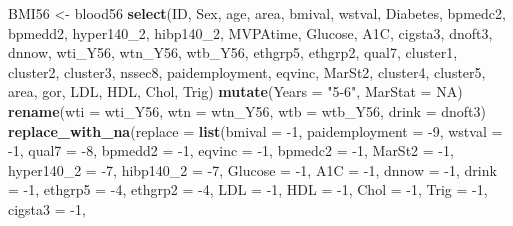 \documentclass[]{article}
\newenvironment{Shaded}{\begin{snugshade}}{\end{snugshade}}
\newcommand{\KeywordTok}[1]{\textcolor[rgb]{0.12,0.11,0.11}{\textbf{#1}}}
\newcommand{\DataTypeTok}[1]{\textcolor[rgb]{0.00,0.34,0.68}{#1}}
\newcommand{\DecValTok}[1]{\textcolor[rgb]{0.69,0.50,0.00}{#1}}
\newcommand{\StringTok}[1]{\textcolor[rgb]{0.75,0.01,0.01}{#1}}
\newcommand{\OtherTok}[1]{\textcolor[rgb]{0.00,0.43,0.16}{#1}}
\newcommand{\OperatorTok}[1]{\textcolor[rgb]{0.12,0.11,0.11}{#1}}
\newcommand{\NormalTok}[1]{\textcolor[rgb]{0.12,0.11,0.11}{#1}}
\begin{document}
\begin{Shaded}
\begin{Highlighting}[]
{{{{{{{{{{{{{{{{{{{{{{{{{{{{{{{{{{{{{{{{{{{\NormalTok{BMI56 <-}\StringTok{ }\NormalTok{blood56 }\OperatorTok{%>%}\StringTok{ }
\StringTok{  }\KeywordTok{select}\NormalTok{(ID, Sex, age, area, bmival, wstval, Diabetes, bpmedc2, bpmedd2, }
\NormalTok{         hyper140_}\DecValTok{2}\NormalTok{, hibp140_}\DecValTok{2}\NormalTok{, MVPAtime, Glucose, A1C, cigsta3, dnoft3, }
\NormalTok{         dnnow, wti_Y56, wtn_Y56, wtb_Y56, ethgrp5, ethgrp2, qual7,}
\NormalTok{         cluster1, cluster2, cluster3, nssec8, paidemployment, eqvinc, }
\NormalTok{         MarSt2, cluster4, cluster5, area, gor, LDL, HDL, Chol, Trig) }\OperatorTok{%>%}\StringTok{ }
\StringTok{  }\KeywordTok{mutate}\NormalTok{(}\DataTypeTok{Years =} \StringTok{"5-6"}\NormalTok{, }\DataTypeTok{MarStat =} \OtherTok{NA}\NormalTok{) }\OperatorTok{%>%}\StringTok{ }
\StringTok{  }\KeywordTok{rename}\NormalTok{(}\DataTypeTok{wti =}\NormalTok{ wti_Y56, }\DataTypeTok{wtn =}\NormalTok{ wtn_Y56, }\DataTypeTok{wtb =}\NormalTok{ wtb_Y56, }\DataTypeTok{drink =}\NormalTok{ dnoft3) }\OperatorTok{%>%}\StringTok{ }
\StringTok{  }\KeywordTok{replace_with_na}\NormalTok{(}\DataTypeTok{replace =} \KeywordTok{list}\NormalTok{(}\DataTypeTok{bmival =} \OperatorTok{-}\DecValTok{1}\NormalTok{, }\DataTypeTok{paidemployment =} \OperatorTok{-}\DecValTok{9}\NormalTok{,}
                                 \DataTypeTok{wstval =} \OperatorTok{-}\DecValTok{1}\NormalTok{, }\DataTypeTok{qual7 =} \OperatorTok{-}\DecValTok{8}\NormalTok{,}
                                 \DataTypeTok{bpmedd2 =} \OperatorTok{-}\DecValTok{1}\NormalTok{, }\DataTypeTok{eqvinc =} \OperatorTok{-}\DecValTok{1}\NormalTok{,}
                                 \DataTypeTok{bpmedc2 =} \OperatorTok{-}\DecValTok{1}\NormalTok{, }\DataTypeTok{MarSt2 =} \OperatorTok{-}\DecValTok{1}\NormalTok{,}
                                 \DataTypeTok{hyper140_2 =} \OperatorTok{-}\DecValTok{7}\NormalTok{, }\DataTypeTok{hibp140_2 =} \OperatorTok{-}\DecValTok{7}\NormalTok{, }
                                 \DataTypeTok{Glucose =} \OperatorTok{-}\DecValTok{1}\NormalTok{,  }\DataTypeTok{A1C  =} \OperatorTok{-}\DecValTok{1}\NormalTok{, }
                                 \DataTypeTok{dnnow =} \OperatorTok{-}\DecValTok{1}\NormalTok{, }\DataTypeTok{drink =} \OperatorTok{-}\DecValTok{1}\NormalTok{, }\DataTypeTok{ethgrp5 =} \OperatorTok{-}\DecValTok{4}\NormalTok{,}
                                 \DataTypeTok{ethgrp2 =} \OperatorTok{-}\DecValTok{4}\NormalTok{, }\DataTypeTok{LDL =} \OperatorTok{-}\DecValTok{1}\NormalTok{, }\DataTypeTok{HDL =} \OperatorTok{-}\DecValTok{1}\NormalTok{, }
                                 \DataTypeTok{Chol =} \OperatorTok{-}\DecValTok{1}\NormalTok{, }\DataTypeTok{Trig =} \OperatorTok{-}\DecValTok{1}\NormalTok{, }\DataTypeTok{cigsta3 =} \OperatorTok{-}\DecValTok{1}\NormalTok{,}
}}}}}}}}}}}}}}}}}}}}}}}}}}}}}}}}}}}}}}}}}}}}}}}
\end{Highlighting}
\end{Shaded}
\end{document}
